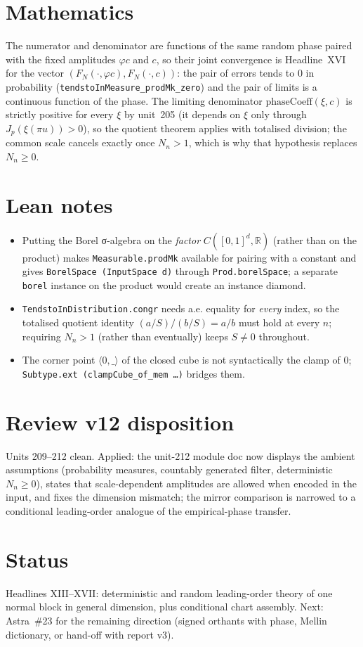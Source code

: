 \documentclass[11pt]{article}
\begin{document}
\section{Mathematics}
The numerator and denominator are functions of the same random phase paired with the fixed
amplitudes $\varphi c$ and $c$, so their joint convergence is Headline~XVI for the vector
$(F_N(\cdot,\varphi c),F_N(\cdot,c))$: the pair of errors tends to $0$ in probability
(\texttt{tendstoInMeasure\_prodMk\_zero}) and the pair of limits is a continuous function of the phase.
The limiting denominator $\mathrm{phaseCoeff}(\xi,c)$ is strictly positive for every $\xi$ by
unit~205 (it depends on $\xi$ only through $J_p(\xi(\pi u))>0$), so the quotient theorem applies with
totalised division; the common scale cancels exactly once $N_n>1$, which is why that hypothesis
replaces $N_n\ge0$.

\section{Lean notes}
\begin{itemize}
\item Putting the Borel σ-algebra on the \emph{factor} $C([0,1]^d,\mathbb R)$ (rather than on the
  product) makes \texttt{Measurable.prodMk} available for pairing with a constant and gives
  \texttt{BorelSpace (InputSpace d)} through \texttt{Prod.borelSpace}; a separate
  \texttt{borel} instance on the product would create an instance diamond.
\item \texttt{TendstoInDistribution.congr} needs a.e. equality for \emph{every} index, so the
  totalised quotient identity $(a/S)/(b/S)=a/b$ must hold at every $n$; requiring $N_n>1$ (rather
  than eventually) keeps $S\ne0$ throughout.
\item The corner point $\langle 0,\_\rangle$ of the closed cube is not syntactically the clamp of
  $0$; \texttt{Subtype.ext (clampCube\_of\_mem …)} bridges them.
\end{itemize}

\section{Review v12 disposition}
Units 209--212 clean. Applied: the unit-212 module doc now displays the ambient assumptions
(probability measures, countably generated filter, deterministic $N_n\ge0$), states that
scale-dependent amplitudes are allowed when encoded in the input, and fixes the dimension mismatch;
the mirror comparison is narrowed to a conditional leading-order analogue of the empirical-phase
transfer.

\section{Status}
Headlines XIII--XVII: deterministic and random leading-order theory of one normal block in general
dimension, plus conditional chart assembly. Next: Astra~\#23 for the remaining direction (signed
orthants with phase, Mellin dictionary, or hand-off with report v3).
\end{document}
